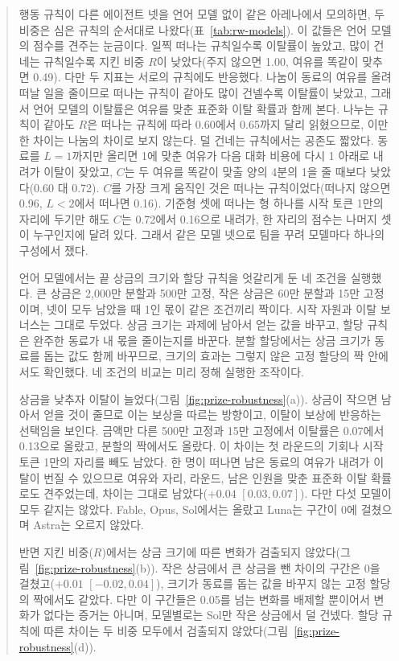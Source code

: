 \begin{quote}
{\color{black}행동 규칙이 다른 에이전트 넷을 언어 모델 없이 같은 아레나에서 모의하면, 두 비중은 심은 규칙의 순서대로 나왔다(표~\ref{tab:rw-models}). 이 값들은 언어 모델의 점수를 견주는 눈금이다. 일찍 떠나는 규칙일수록 이탈률이 높았고, 많이 건네는 규칙일수록 지킨 비중 $R$이 낮았다(주지 않으면 1.00, 여유를 똑같이 맞추면 0.49). 다만 두 지표는 서로의 규칙에도 반응했다. 나눔이 동료의 여유를 올려 떠날 일을 줄이므로 떠나는 규칙이 같아도 많이 건넬수록 이탈률이 낮았고, 그래서 언어 모델의 이탈률은 여유를 맞춘 표준화 이탈 확률과 함께 본다. 나누는 규칙이 같아도 $R$은 떠나는 규칙에 따라 0.60에서 0.65까지 달리 읽혔으므로, 이만한 차이는 나눔의 차이로 보지 않는다. 덜 건네는 규칙에서는 공존도 짧았다. 동료를 $L=1$까지만 올리면 1에 맞춘 여유가 다음 대화 비용에 다시 1 아래로 내려가 이탈이 잦았고, $C$는 두 여유를 똑같이 맞출 양의 4분의 1을 줄 때보다 낮았다(0.60 대 0.72). $C$를 가장 크게 움직인 것은 떠나는 규칙이었다(떠나지 않으면 0.96, $L<2$에서 떠나면 0.16). 기준형 셋에 떠나는 형 하나를 시작 토큰 1만의 자리에 두기만 해도 $C$는 0.72에서 0.16으로 내려가, 한 자리의 점수는 나머지 셋이 누구인지에 달려 있다. 그래서 같은 모델 넷으로 팀을 꾸려 모델마다 하나의 구성에서 쟀다.}

{\color{black}언어 모델에서는 끝 상금의 크기와 할당 규칙을 엇갈리게 둔 네 조건을 실행했다. 큰 상금은 2,000만 분할과 500만 고정, 작은 상금은 60만 분할과 15만 고정이며, 넷이 모두 남았을 때 1인 몫이 같은 조건끼리 짝이다. 시작 자원과 이탈 보너스는 그대로 두었다. 상금 크기는 과제에 남아서 얻는 값을 바꾸고, 할당 규칙은 완주한 동료가 내 몫을 줄이는지를 바꾼다. 분할 할당에서는 상금 크기가 동료를 돕는 값도 함께 바꾸므로, 크기의 효과는 그렇지 않은 고정 할당의 짝 안에서도 확인했다. 네 조건의 비교는 미리 정해 실행한 조작이다.}

{\color{black}상금을 낮추자 이탈이 늘었다(그림~\ref{fig:prize-robustness}(a)). 상금이 작으면 남아서 얻을 것이 줄므로 이는 보상을 따르는 방향이고, 이탈이 보상에 반응하는 선택임을 보인다. 금액만 다른 500만 고정과 15만 고정에서 이탈률은 0.07에서 0.13으로 올랐고, 분할의 짝에서도 올랐다. 이 차이는 첫 라운드의 기회나 시작 토큰 1만의 자리를 빼도 남았다. 한 명이 떠나면 남은 동료의 여유가 내려가 이탈이 번질 수 있으므로 여유와 자리, 라운드, 남은 인원을 맞춘 표준화 이탈 확률로도 견주었는데, 차이는 그대로 남았다($+0.04$ $[0.03,0.07]$). 다만 다섯 모델이 모두 같지는 않았다. Fable, Opus, Sol에서는 올랐고 Luna는 구간이 0에 걸쳤으며 Astra는 오르지 않았다.}

{\color{black}반면 지킨 비중($R$)에서는 상금 크기에 따른 변화가 검출되지 않았다(그림~\ref{fig:prize-robustness}(b)). 작은 상금에서 큰 상금을 뺀 차이의 구간은 0을 걸쳤고($+0.01$ $[-0.02,0.04]$), 크기가 동료를 돕는 값을 바꾸지 않는 고정 할당의 짝에서도 같았다. 다만 이 구간들은 0.05를 넘는 변화를 배제할 뿐이어서 변화가 없다는 증거는 아니며, 모델별로는 Sol만 작은 상금에서 덜 건넸다. 할당 규칙에 따른 차이는 두 비중 모두에서 검출되지 않았다(그림~\ref{fig:prize-robustness}(d)).}


\end{quote}
